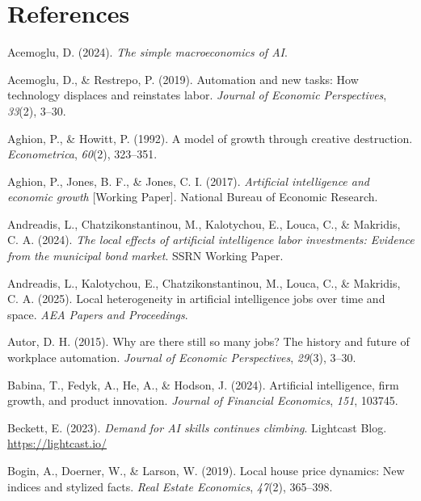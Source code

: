 \documentclass[
]{article}
\newlength{\cslhangindent}
\newenvironment{CSLReferences}[2] %
 {\begin{list}{}{%
  \setlength{\itemindent}{0pt}
  \setlength{\leftmargin}{0pt}
  \setlength{\parsep}{0pt}
  \ifodd #1
   \setlength{\leftmargin}{\cslhangindent}
   \setlength{\itemindent}{-1\cslhangindent}
  \fi
  \setlength{\itemsep}{#2\baselineskip}}}
 {\end{list}}
\begin{document}
\section*{References}\label{references}

\label{refs}
\begin{CSLReferences}{1}{0}
Acemoglu, D. (2024). \emph{The simple macroeconomics of AI}.

Acemoglu, D., \& Restrepo, P. (2019). Automation and new tasks: How
technology displaces and reinstates labor. \emph{Journal of Economic
Perspectives}, \emph{33}(2), 3--30.

Aghion, P., \& Howitt, P. (1992). A model of growth through creative
destruction. \emph{Econometrica}, \emph{60}(2), 323--351.

Aghion, P., Jones, B. F., \& Jones, C. I. (2017). \emph{Artificial
intelligence and economic growth} {[}Working Paper{]}. National Bureau
of Economic Research.

Andreadis, L., Chatzikonstantinou, M., Kalotychou, E., Louca, C., \&
Makridis, C. A. (2024). \emph{The local effects of artificial
intelligence labor investments: Evidence from the municipal bond
market}. SSRN Working Paper.

Andreadis, L., Kalotychou, E., Chatzikonstantinou, M., Louca, C., \&
Makridis, C. A. (2025). Local heterogeneity in artificial intelligence
jobs over time and space. \emph{AEA Papers and Proceedings}.

Autor, D. H. (2015). Why are there still so many jobs? The history and
future of workplace automation. \emph{Journal of Economic Perspectives},
\emph{29}(3), 3--30.

Babina, T., Fedyk, A., He, A., \& Hodson, J. (2024). Artificial
intelligence, firm growth, and product innovation. \emph{Journal of
Financial Economics}, \emph{151}, 103745.

Beckett, E. (2023). \emph{Demand for AI skills continues climbing}.
Lightcast Blog. \url{https://lightcast.io/}

Bogin, A., Doerner, W., \& Larson, W. (2019). Local house price
dynamics: New indices and stylized facts. \emph{Real Estate Economics},
\emph{47}(2), 365--398.


\end{CSLReferences}
\end{document}
